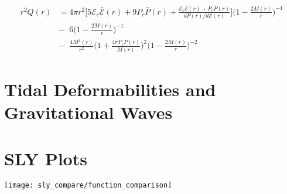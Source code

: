 \documentclass[11pt]{article}
\numberwithin{equation}{section}
\begin{document}
\begin{align} 
r^{2} Q(r) &= 4 \pi r^{2} \bigg[ 5 \mathcal{E}_{c}\bar{\mathcal{E}}(r)+ 9 P_{c}\bar{P}(r) + \frac{\mathcal{E}_{c}\bar{\mathcal{E}}(r) + P_{c}\bar{P}(r)}{dP(r)/d\mathcal{E}(r)}   \bigg] \bigg(  1 - \frac{2 M(r)}{r} \bigg) ^{-1} \\
& - \;\; 6 \bigg( 1- \frac{2 M(r) }{r }  \bigg)^{-1} \nonumber \\	
& - \;\; \frac{4 M^{2}(r)}{r^{2}} \bigg( 1 + \frac{4 \pi P_{c} \bar{P}(r)}{M(r)}  \bigg)^{2} \bigg( 1 - \frac{2 M(r)}{r} \bigg)^{-2} \nonumber
\end{align}







\section{Tidal Deformabilities and Gravitational Waves}

\clearpage

\section{SLY Plots}

\texttt{[image: sly\_compare/function\_comparison]} \\



\end{document}
